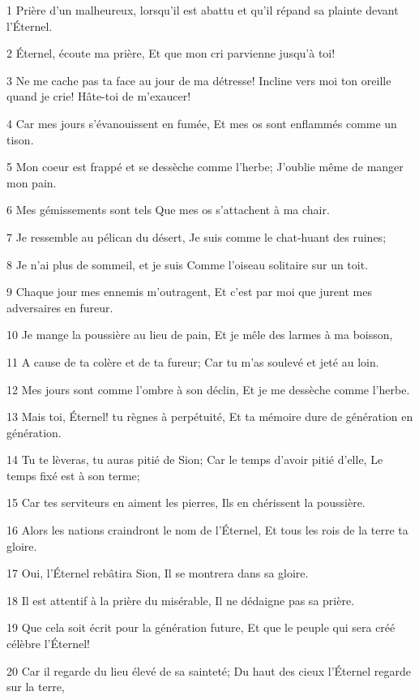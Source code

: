 \par 1 Prière d'un malheureux, lorsqu'il est abattu et qu'il répand sa plainte devant l'Éternel.
\par 2 Éternel, écoute ma prière, Et que mon cri parvienne jusqu'à toi!
\par 3 Ne me cache pas ta face au jour de ma détresse! Incline vers moi ton oreille quand je crie! Hâte-toi de m'exaucer!
\par 4 Car mes jours s'évanouissent en fumée, Et mes os sont enflammés comme un tison.
\par 5 Mon coeur est frappé et se dessèche comme l'herbe; J'oublie même de manger mon pain.
\par 6 Mes gémissements sont tels Que mes os s'attachent à ma chair.
\par 7 Je ressemble au pélican du désert, Je suis comme le chat-huant des ruines;
\par 8 Je n'ai plus de sommeil, et je suis Comme l'oiseau solitaire sur un toit.
\par 9 Chaque jour mes ennemis m'outragent, Et c'est par moi que jurent mes adversaires en fureur.
\par 10 Je mange la poussière au lieu de pain, Et je mêle des larmes à ma boisson,
\par 11 A cause de ta colère et de ta fureur; Car tu m'as soulevé et jeté au loin.
\par 12 Mes jours sont comme l'ombre à son déclin, Et je me dessèche comme l'herbe.
\par 13 Mais toi, Éternel! tu règnes à perpétuité, Et ta mémoire dure de génération en génération.
\par 14 Tu te lèveras, tu auras pitié de Sion; Car le temps d'avoir pitié d'elle, Le temps fixé est à son terme;
\par 15 Car tes serviteurs en aiment les pierres, Ils en chérissent la poussière.
\par 16 Alors les nations craindront le nom de l'Éternel, Et tous les rois de la terre ta gloire.
\par 17 Oui, l'Éternel rebâtira Sion, Il se montrera dans sa gloire.
\par 18 Il est attentif à la prière du misérable, Il ne dédaigne pas sa prière.
\par 19 Que cela soit écrit pour la génération future, Et que le peuple qui sera créé célèbre l'Éternel!
\par 20 Car il regarde du lieu élevé de sa sainteté; Du haut des cieux l'Éternel regarde sur la terre,
